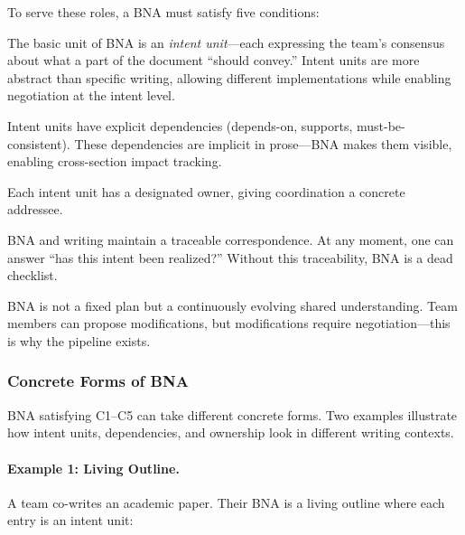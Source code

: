 To serve these roles, a BNA must satisfy five conditions:

\begin{description}[leftmargin=1.5em, nosep, itemsep=3pt]
\item[C1: Composed of intent units.] The basic unit of BNA is an \emph{intent unit}---each expressing the team's consensus about what a part of the document ``should convey.'' Intent units are more abstract than specific writing, allowing different implementations while enabling negotiation at the intent level.

\item[C2: Has internal dependency structure.] Intent units have explicit dependencies (depends-on, supports, must-be-consistent). These dependencies are implicit in prose---BNA makes them visible, enabling cross-section impact tracking.

\item[C3: Has ownership.] Each intent unit has a designated owner, giving coordination a concrete addressee.

\item[C4: Traceable to writing.] BNA and writing maintain a traceable correspondence. At any moment, one can answer ``has this intent been realized?'' Without this traceability, BNA is a dead checklist.

\item[C5: Dynamically negotiable.] BNA is not a fixed plan but a continuously evolving shared understanding. Team members can propose modifications, but modifications require negotiation---this is why the pipeline exists.
\end{description}


\subsubsection{Concrete Forms of BNA}

BNA satisfying C1--C5 can take different concrete forms. Two examples illustrate how intent units, dependencies, and ownership look in different writing contexts.

\paragraph{Example 1: Living Outline.} A team co-writes an academic paper. Their BNA is a living outline where each entry is an intent unit:

